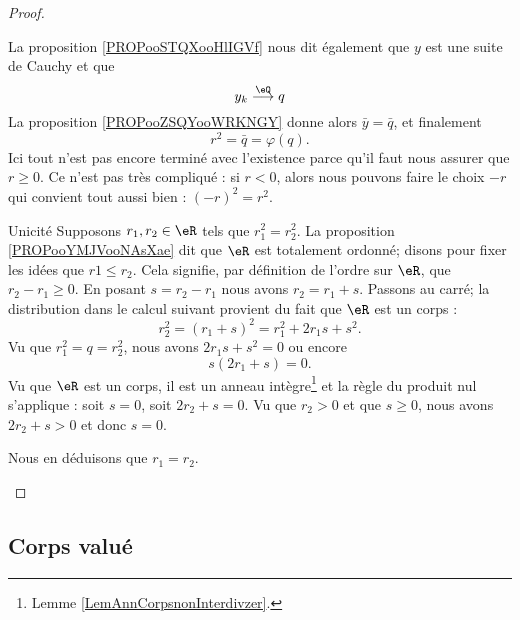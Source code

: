 \begin{proof}
\begin{subproof}
            La proposition \ref{PROPooSTQXooHlIGVf} nous dit également que \( y\) est une suite de Cauchy et que
            \begin{equation}
                y_k\stackrel{\eQ}{\longrightarrow}q
            \end{equation}
            La proposition \ref{PROPooZSQYooWRKNGY} donne alors \( \bar y=\bar q\), et finalement
            \begin{equation}
                r^2=\bar q=\varphi(q).
            \end{equation}
            Ici tout n'est pas encore terminé avec l'existence parce qu'il faut nous assurer que \( r\geq 0\). Ce n'est pas très compliqué : si \( r<0\), alors nous pouvons faire le choix \( -r\) qui convient tout aussi bien : \( (-r)^2=r^2\).
        \item[Unicité]
            Supposons \( r_1,r_2\in \eR\) tels que \( r_1^2=r_2^2\). La proposition \ref{PROPooYMJVooNAsXae} dit que \( \eR\) est totalement ordonné; disons pour fixer les idées que \( r1\leq r_2\). Cela signifie, par définition de l'ordre sur \( \eR\), que \( r_2-r_1\geq 0\). En posant \( s=r_2-r_1\) nous avons \( r_2=r_1+s\). Passons au carré; la distribution dans le calcul suivant provient du fait que \( \eR\) est un corps :
            \begin{equation}
                r_2^2=(r_1+s)^2=r_1^2+2r_1s+s^2.
            \end{equation}
            Vu que \( r_1^2=q=r_2^2\), nous avons \( 2r_1s+s^2=0\) ou encore
            \begin{equation}
                s(2r_1+s)=0.
            \end{equation}
            Vu que \( \eR\) est un corps, il est un anneau intègre\footnote{Lemme \ref{LemAnnCorpsnonInterdivzer}.} et la règle du produit nul s'applique : soit \( s=0\), soit \( 2r_2+s=0\). Vu que \( r_2>0\) et que \( s\geq 0\), nous avons \( 2r_2+s>0\) et donc \( s=0\). 

            Nous en déduisons que \( r_1=r_2\).
    \end{subproof}
\end{proof}


\subsection{Corps valué}

